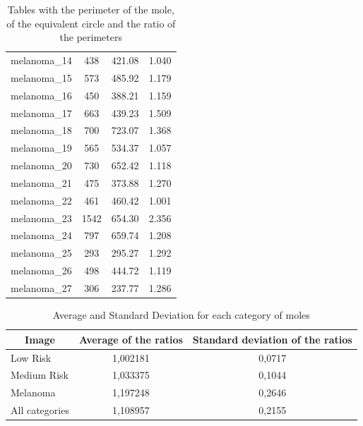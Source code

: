 \documentclass[12pt]{report}
\begin{document}
\begin{table}[ht]
\begin{minipage}[b]{0.1\linewidth}
\begin{tabular}{|c|c|c|c|}
melanoma\_14                        &438	 &421.08	 &1.040\\
melanoma\_15                        &573	 &485.92	 &1.179\\
melanoma\_16                        &450	 &388.21	 &1.159\\
melanoma\_17                        &663	 &439.23	 &1.509\\
melanoma\_18                        &700	 &723.07	 &1.368\\
melanoma\_19                        &565	 &534.37	 &1.057\\
melanoma\_20                        &730	 &652.42	 &1.118\\
melanoma\_21                        &475	 &373.88	 &1.270\\
melanoma\_22                        &461	 &460.42	 &1.001\\
melanoma\_23                        &1542&654.30 &2.356\\
melanoma\_24                        &797	 &659.74	 &1.208\\
melanoma\_25                        &293	 &295.27	 &1.292\\
melanoma\_26                        &498	 &444.72	 &1.119\\
melanoma\_27                        &306	 &237.77	 &1.286\\
\hline
\end{tabular}
\end{minipage}
\caption{Tables with the perimeter of the mole, of the equivalent circle and the ratio of the perimeters}
\label{table1}
\end{table}


\begin{table}[ht]\footnotesize
\centering
\begin{tabular}{|l|c|c|}
\hline
\multicolumn{1}{|c|}{\textbf{Image}} & \textbf{Average of the ratios} & \textbf{Standard deviation of the ratios} \\ \hline
Low Risk & 1,002181 & 0,0717 \\
Medium Risk & 1,033375 & 0,1044 \\
Melanoma & 1,197248 & 0,2646 \\ \hline
All categories & 1,108957 & 0,2155 \\ \hline
\end{tabular}
\caption{Average and Standard Deviation for each category of moles}
\label{table2}
\end{table}
\end{document}
